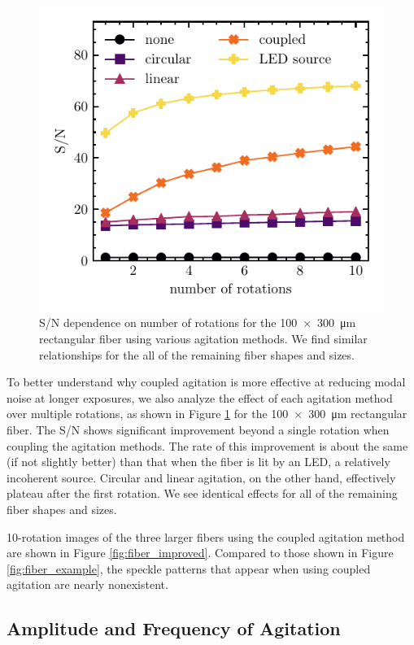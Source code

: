 \begin{figure}
\centering
	\includegraphics[width=0.68\columnwidth]{figures-2/rect_snr_vs_time.pdf}
	\caption[Signal-to-noise comparison across number of rotations and agitation method]{S/N dependence on number of rotations for the \SI{100x300}{\micro\meter} rectangular fiber using various agitation methods. We find similar relationships for the all of the remaining fiber shapes and sizes.}
\label{fig:rect_snr_vs_time}
\end{figure}

To better understand why coupled agitation is more effective at reducing modal noise at longer exposures, we also analyze the effect of each agitation method over multiple rotations, as shown in Figure \ref{fig:rect_snr_vs_time} for the \SI{100x300}{\micro\meter} rectangular fiber. The S/N shows significant improvement beyond a single rotation when coupling the agitation methods. The rate of this improvement is about the same (if not slightly better) than that when the fiber is lit by an LED, a relatively incoherent source. Circular and linear agitation, on the other hand, effectively plateau after the first rotation. We see identical effects for all of the remaining fiber shapes and sizes.

10-rotation images of the three larger fibers using the coupled agitation method are shown in Figure \ref{fig:fiber_improved}. Compared to those shown in Figure \ref{fig:fiber_example}, the speckle patterns that appear when using coupled agitation are nearly nonexistent.

\subsection{Amplitude and Frequency of Agitation}
\label{modal-noise:results:amp-freq}

